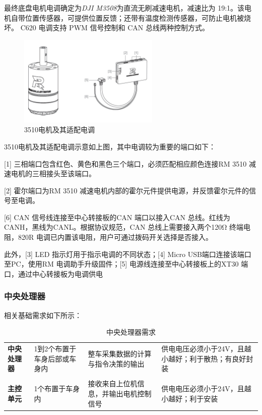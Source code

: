 最终底盘电机电调确定为\emph{DJI M3508}为直流无刷减速电机，减速比为 19:1。该电机自带位置传感器，可提供位置反馈；还带有温度检测传感器，可防止电机被烧坏。 C620 电调支持 PWM 信号控制和 CAN 总线两种控制方式。

\begin{figure}[H]
	\centering
	\includegraphics[width = 0.6\textwidth]{fig/3510.png}
	\caption{3510电机及其适配电调}
	\label{3510}
\end{figure}

3510电机及其适配电调示意如上图，其中电调较为重要的端口如下：

[1] 三相端口包含红色、黄色和黑色三个端口，必须匹配相应颜色连接RM 3510 减速电机的三相接头至该端口。

[2] 霍尔端口为RM 3510 减速电机内部的霍尔元件提供电源，并反馈霍尔元件的信号至电调。

[6] CAN 信号线连接至中心转接板的CAN 端口以接入CAN 总线。红线为CANH，黑线为CANL。根据协议规范，CAN 总线上需要接入两个120Ω 终端电阻，820R 电调已内置该电阻，用户可通过拨码开关选择是否接入。

此外，[3] LED 指示灯用于指示电调的不同状态；[4] Micro USB端口连接该端口至PC，使用RM 电调助手升级固件；[5] 电源线连接至中心转接板上的XT30 端口，通过中心转接板为电调供电



\subsubsection{中央处理器}

相关基础需求如下所示：

\begin{table}[H]
	\centering%
	\caption[centering]{中央处理器需求}%
	\label{cpuxq}%
	\begin{tabular}{C{2cm}C{3cm}p{3cm}p{4cm}}	
		\toprule
		 & & &\\ 
		\midrule
		
		\textbf{中央处理器} & 1到2个布置于车身后部或车身内 & 整车采集数据的计算与指令决策的输出 & 供电电压必须小于24V，且越小越好；利于散热；有良好封装 \\
		\\
		\textbf{主控单元} & 1个布置于车身内 & 接收来自上位机信息，并输出电机控制信号 & 供电电压必须小于24V，且越小越好；利于安装 \\
		\bottomrule
	\end{tabular}
\end{table}

